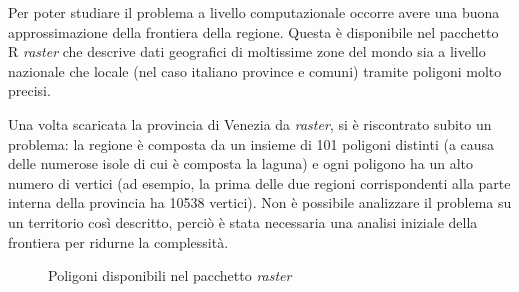 \documentclass[a4paper,11pt,twoside,openright]{book}							%
\begin{document}
Per poter studiare il problema a livello computazionale occorre avere una buona approssimazione della frontiera della regione. Questa è disponibile nel pacchetto R \textit{raster} che descrive dati geografici di moltissime zone del mondo sia a livello nazionale che locale (nel caso italiano province e comuni) tramite poligoni molto precisi.

Una volta scaricata la provincia di Venezia da \textit{raster}, si è riscontrato subito un problema: la regione è composta da un insieme di 101 poligoni distinti (a causa delle numerose isole di cui è composta la laguna) e ogni poligono ha un alto numero di vertici (ad esempio, la prima delle due regioni corrispondenti alla parte interna della provincia ha 10538 vertici). Non è possibile analizzare il problema su un territorio così descritto, perciò è stata necessaria una analisi iniziale della frontiera per ridurne la complessità. 

\begin{figure}[t]
	\centering
	\caption{Poligoni disponibili nel pacchetto \textit{raster}}
	\label{fig:Ven_poligoni}
\end{figure}
\end{document}
